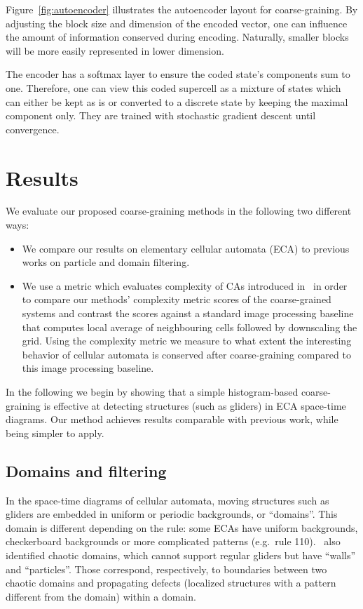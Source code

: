 Figure~\ref{fig:autoencoder} illustrates the autoencoder layout for
coarse-graining. By adjusting the block size and dimension of the encoded
vector, one can influence the amount of information conserved during encoding.
Naturally, smaller blocks will be more easily represented in lower dimension.

The encoder has a softmax layer to ensure the coded state's components sum to
one. Therefore, one can view this coded supercell as a mixture of states which
can either be kept as is or converted to a discrete state by keeping the maximal
component only. They are trained with stochastic gradient descent until
convergence.

\section{\label{sec:results}Results}

We evaluate our proposed coarse-graining methods in the following two different ways:
\begin{itemize}
\item We compare our results on elementary cellular automata (ECA) to previous
  works on particle and domain filtering.
\item We use a metric which evaluates complexity of CAs introduced
  in~\parencite{cisnerosEvolvingStructuresComplex2019} in order to compare our
  methods' complexity metric scores of the coarse-grained systems and contrast
  the scores against a standard image processing baseline that computes local
  average of neighbouring cells followed by downscaling the grid. Using the
  complexity metric we measure to what extent the interesting behavior of
  cellular automata is conserved after coarse-graining compared to this image
  processing baseline.
\end{itemize}

In the following we begin by showing that a simple histogram-based
coarse-graining is effective at detecting structures (such as gliders) in ECA
space-time diagrams. Our method achieves results comparable with previous work,
while being simpler to apply.

\subsection{Domains and filtering}

In the space-time diagrams of cellular automata, moving structures such as
gliders are embedded in uniform or periodic backgrounds, or ``domains''. This
domain is different depending on the rule: some ECAs have uniform backgrounds,
checkerboard backgrounds or more complicated patterns (e.g.\ rule
110).~\parencite{crutchfieldTurbulentPatternBases1993} also identified chaotic
domains, which cannot support regular gliders but have ``walls'' and
``particles''. Those correspond, respectively, to boundaries between two chaotic
domains and propagating defects (localized structures with a pattern different
from the domain) within a domain.

